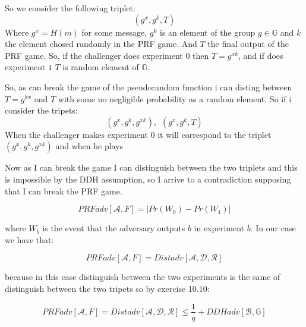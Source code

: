 So we consider the following triplet:
$$
(g^{x},g^{k},T)
$$
Where $g^{x}=H(m)$ for some message, $g^{k}$ is an element of the group $g\in\mathbb{G}$  and $k$ the element chosed randomly in the PRF game. And $T$ the final output of the PRF game. So, if the challenger does experiment $0$ then $T=g^{xk}$, and if does experiment $1$ $T$ is random element of $\mathbb{G}$.

So, as can break the game of the pseudorandom function i can disting between $T=g^{kx}$ and $T$ with some no negligible probability as a random element. So if i consider the tripets:
\begin{equation*}
    (g^{x},g^{k},g^{xk}), \hspace{5pt} (g^{x},g^{k},T)
\end{equation*}
When the challenger makes experiment $0$ it will correspond to the triplet $(g^{x},g^{k},g^{xk})$ and when he plays 

Now as I can break the game I can distinguish between the two triplets and this is impossible by the DDH assumption, so I arrive to a contradiction supposing that I can break the PRF game.

$$PRFadv[\mathcal{A},F]=|Pr(W_{0})-Pr(W_{1})|$$

where $W_{b}$ is the event that the adversary outputs $b$ in experiment $b$. In our case we have that:

$$PRFadv[\mathcal{A},F]=Distadv[\mathcal{A},\mathcal{D},\mathcal{R}]$$

because in this case distinguish between the two experiments is the same of distinguish between the two tripets so by exercise 10.10:

$$PRFadv[\mathcal{A},F]=Distadv[\mathcal{A},\mathcal{D},\mathcal{R}]\leq \frac{1}{q}+ DDHadv[\mathcal{B},\mathbb{G}]$$

